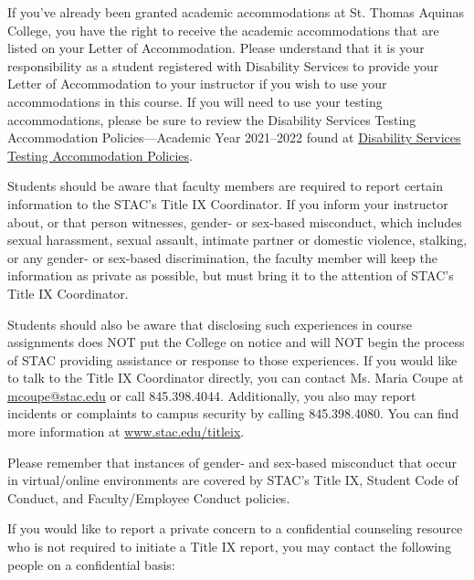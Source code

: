 \documentclass[11pt,letterpaper]{article}
\begin{document}
If you've already been granted academic accommodations at St. Thomas Aquinas College, you have the right to receive the academic accommodations that are listed on your Letter of Accommodation.  Please understand that it is your responsibility as a student registered with Disability Services to provide your Letter of Accommodation to your instructor if you wish to use your accommodations in this course. If you will need to use your testing accommodations, please be sure to review the Disability Services Testing Accommodation Policies---Academic Year 2021--2022 found at \href{https://docs.google.com/document/d/1V5iUtgypiS8kClqhSLPde7AOSZPoLu6CsIDcpiEic2w/edit?usp=sharing}{Disability Services Testing Accommodation Policies}.
\sectionbreak




Students should be aware that faculty members are required to report certain information to the STAC's Title IX Coordinator. If you inform your instructor about, or that person witnesses, gender- or sex-based misconduct, which includes sexual harassment, sexual assault, intimate partner or domestic violence, stalking, or any gender- or sex-based discrimination, the faculty member will keep the information as private as possible, but must bring it to the attention of STAC's Title IX Coordinator. \pspace

Students should also be aware that disclosing such experiences in course assignments does NOT put the College on notice and will NOT begin the process of STAC providing assistance or response to those experiences. If you would like to talk to the Title IX Coordinator directly, you can contact Ms. Maria Coupe at \href{mailto:mcoupe@stac.edu}{mcoupe@stac.edu} or call 845.398.4044. Additionally, you also may report incidents or complaints to campus security by calling 845.398.4080. You can find more information at \href{www.stac.edu/titleix}{www.stac.edu/titleix}. \pspace

Please remember that instances of gender- and sex-based misconduct that occur in virtual/online environments are covered by STAC's Title IX, Student Code of Conduct, and Faculty/Employee Conduct policies. \pspace

If you would like to report a private concern to a confidential counseling resource who is not required to initiate a Title IX report, you may contact the following people on a confidential basis: \pspace
\end{document}
